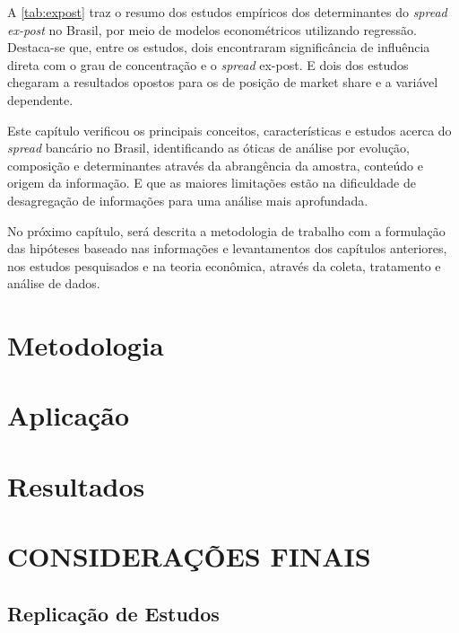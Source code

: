 \documentclass[12pt,openright,oneside,a4paper,chapter=TITLE,section=TITLE,subsection=Title,english,french,spanish,portugues,sumario=tradicional]{04-class-files/abntex2}
\begin{document}
A \autoref{tab:expost} traz o resumo dos estudos empíricos dos determinantes do
\emph{spread ex-post} no Brasil, por meio de modelos econométricos utilizando
regressão. Destaca-se que, entre os estudos, dois encontraram significância de
influência direta com o grau de concentração e o \emph{spread} ex-post. E dois dos
estudos chegaram a resultados opostos para os de posição de market share e a
variável dependente.

Este capítulo verificou os principais conceitos, características e estudos
acerca do \emph{spread} bancário no Brasil, identificando as óticas de análise por
evolução, composição e determinantes através da abrangência da amostra,
conteúdo e origem da informação. E que as maiores limitações estão na
dificuldade de desagregação de informações para uma análise mais aprofundada.

No próximo capítulo, será descrita a metodologia de trabalho com a formulação
das hipóteses baseado nas informações e levantamentos dos capítulos anteriores,
nos estudos pesquisados e na teoria econômica, através da coleta, tratamento e
análise de dados.

\chapter{Metodologia}

\chapter{Aplicação}

\chapter{Resultados}


\chapter*[Conclusão]{CONSIDERAÇÕES FINAIS}

\postextual


\postextual


{\begin{apendicesenv}

\renewcommand{\thechapter}{\arabic{chapter}}

\chapter{Replicação de Estudos}
\section{}
 
\end{apendicesenv}
}{}
\end{document}
